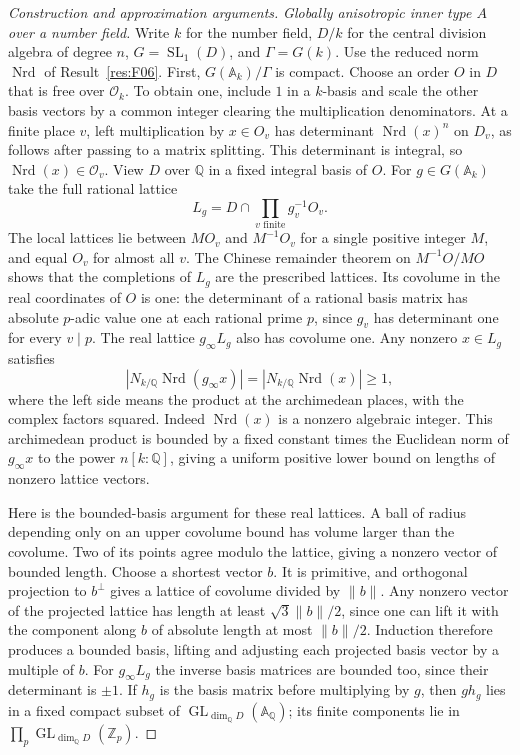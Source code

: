 \documentclass[11pt,a4paper,openany,oneside]{book}
\theoremstyle{resultstyle}
\theoremstyle{definition}
\numberwithin{equation}{chapter}
\begin{document}
\begin{proof}[Construction and approximation arguments]
\medskip\noindent
\textit{Globally anisotropic inner type \(A\) over a number field.}
Write \(k\) for the number field, \(D/k\) for the central division
algebra of degree \(n\), \(G=\operatorname{SL}_1(D)\), and
\(\Gamma=G(k)\). Use the reduced norm \(\operatorname{Nrd}\) of
Result~\ref{res:F06}. First, \(G(\mathbb A_k)/\Gamma\) is compact.
Choose an order \(O\) in \(D\) that is free over \(\mathcal O_k\).
To obtain one, include \(1\) in a \(k\)-basis and scale the other
basis vectors by a common integer clearing the multiplication
denominators. At a finite place \(v\), left multiplication by
\(x\in O_v\) has determinant \(\operatorname{Nrd}(x)^n\) on \(D_v\),
as follows after passing to a matrix splitting. This determinant is
integral, so \(\operatorname{Nrd}(x)\in\mathcal O_v\).
View \(D\) over \(\mathbb Q\) in a fixed integral basis of \(O\).
For \(g\in G(\mathbb A_k)\) take the full rational lattice
\[
 L_g=D\cap\prod_{v\text{ finite}}g_v^{-1}O_v.
\]
The local lattices lie between \(M O_v\) and \(M^{-1}O_v\) for a
single positive integer \(M\), and equal \(O_v\) for almost all
\(v\). The Chinese remainder theorem on \(M^{-1}O/MO\) shows that
the completions of \(L_g\) are the prescribed lattices. Its
covolume in the real coordinates of \(O\) is one: the determinant
of a rational basis matrix has absolute \(p\)-adic value one at
each rational prime \(p\), since \(g_v\) has determinant one for
every \(v\mid p\). The real lattice \(g_\infty L_g\) also has
covolume one. Any nonzero \(x\in L_g\) satisfies
\[
  |N_{k/\mathbb Q}\operatorname{Nrd}(g_\infty x)|
  =|N_{k/\mathbb Q}\operatorname{Nrd}(x)|\geq 1,
\]
where the left side means the product at the archimedean places,
with the complex factors squared. Indeed \(\operatorname{Nrd}(x)\)
is a nonzero algebraic integer. This archimedean product is
bounded by a fixed constant times the Euclidean norm of
\(g_\infty x\) to the power \(n[k:\mathbb Q]\), giving a uniform
positive lower bound on lengths of nonzero lattice vectors.

Here is the bounded-basis argument for these real lattices.
A ball of radius depending only on an upper covolume bound has
volume larger than the covolume. Two of its points agree modulo
the lattice, giving a nonzero vector of bounded length. Choose a
shortest vector \(b\). It is primitive, and orthogonal projection to
\(b^\perp\) gives a lattice of covolume divided by \(\|b\|\). Any
nonzero vector of the projected lattice has length at least
\(\sqrt{3}\|b\|/2\), since one can lift it with the component along
\(b\) of absolute length at most \(\|b\|/2\). Induction therefore
produces a bounded basis, lifting and adjusting each projected
basis vector by a multiple of \(b\). For \(g_\infty L_g\) the inverse
basis matrices are bounded too, since their determinant is
\(\pm1\). If \(h_g\) is the basis matrix before multiplying by \(g\),
then \(g h_g\) lies in a fixed compact subset of
\(\operatorname{GL}_{\dim_{\mathbb Q}D}(\mathbb A_{\mathbb Q})\);
its finite components lie in \(\prod_p\operatorname{GL}_{\dim_{\mathbb Q}D}
(\mathbb Z_p)\).


\end{proof}
\end{document}
